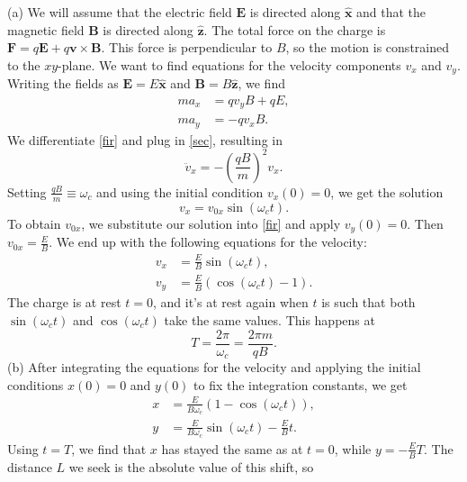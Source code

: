 \documentclass[../TST.tex]{subfiles}
\begin{document}
\ifprob \else
\begin{solution} 
(a) We will assume that the electric field $\mathbf{E}$ is directed along $\hat{\mathbf{x}}$  and that the magnetic field $\mathbf{B}$ is directed along $\hat{\mathbf{z}}$. The total force on the charge is $\mathbf{F}=q\mathbf{E}+q\mathbf{v}\times\mathbf{B}$. This force is perpendicular to $B$, so the motion is constrained to the $xy$-plane. We want to find equations for the velocity components $v_x$ and $v_y$. Writing the fields as $\mathbf{E}=E \hat{\mathbf{x}}$ and $\mathbf{B}=B \hat{\mathbf{z}}$, we find
\begin{align}
	ma_x&= qv_yB+qE, \label{fir}\\
	ma_y&=-qv_xB. \label{sec} 
\end{align}
We differentiate \eqref{fir} and plug in \eqref{sec}, resulting in
\begin{equation*}
	\ddot{v}_x=-\left(\frac{qB}{m}\right)^2v_x
.
\end{equation*}
Setting $\frac{qB}{m}\equiv\omega_c$ and using the initial condition $v_x(0)=0$, we get the solution
\begin{equation*}
	v_x=v_{0x}\sin{(\omega_ct)}
.
\end{equation*}
To obtain $v_{0x}$, we substitute our solution into \eqref{fir} and apply $v_y(0)=0$. Then $v_{0x}=\frac{E}{B}$. We end up with the following equations for the velocity:
\begin{align*}
	v_x&= \frac{E}{B}\sin{(\omega_c t)},\\
	v_y&= \frac{E}{B}\left(\cos{(\omega_ct)}-1\right). 
\end{align*}
The charge is at rest $t=0$, and it's at rest again when $t$ is such that both $\sin{(\omega_c t)}$ and $\cos{(\omega_c t)}$ take the same values. This happens at 
\begin{equation*}
T=\frac{2\pi}{\omega_c}=\boxed{\frac{2\pi m}{qB}.}
\end{equation*}
(b) After integrating the equations for the velocity and applying the initial conditions $x(0)=0$ and $y(0)$ to fix the integration constants, we get
\begin{align*}
	x&= \frac{E}{B\omega_c}\left(1-\cos{(\omega_c t)}\right) ,\\
	y&= \frac{E}{B\omega_c}\sin{(\omega_ct)}-\frac{E}{B}t. 
\end{align*}
Using $t=T$, we find that $x$ has stayed the same as at $t=0$, while $y=-\frac{E}{B}T$. The distance $L$ we seek is the absolute value of this shift, so
\begin{equation*}

\end{equation*}
\end{solution}
\end{document}
